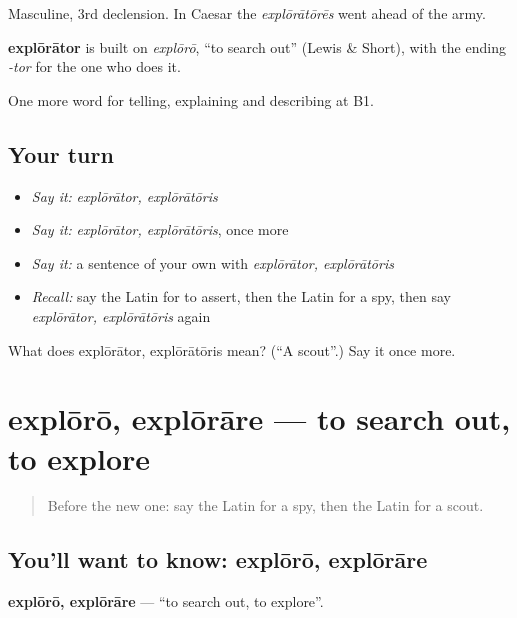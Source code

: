 Masculine, 3rd declension. In Caesar the \emph{explōrātōrēs} went ahead of the army.

\begin{cousinweb}
\textbf{explōrātor} is built on \emph{explōrō}, \textquotedblleft{}to search out\textquotedblright{} (Lewis \& Short), with the ending \emph{-tor} for the one who does it.
\end{cousinweb}

\begin{grammarlens}[title={What you've built}]
One more word for telling, explaining and describing at B1.
\end{grammarlens}

\subsection*{Your turn}
\begin{itemize}
\raggedright
  \item \emph{Say it:} \emph{explōrātor, explōrātōris}
  \item \emph{Say it:} \emph{explōrātor, explōrātōris}, once more
  \item \emph{Say it:} a sentence of your own with \emph{explōrātor, explōrātōris}
  \item \emph{Recall:} say the Latin for to assert, then the Latin for a spy, then say \emph{explōrātor, explōrātōris} again
\end{itemize}

\begin{tcolorbox}[breakable,colback=teal!4,colframe=teal!35!black,title={Before you move on}]
What does explōrātor, explōrātōris mean? (\textquotedblleft{}A scout\textquotedblright{}.) Say it once more.
\end{tcolorbox}
\section[explōrō, explōrāre]{explōrō, explōrāre — to search out, to explore}

\label{lesson:LA-C302-exploro}



\begin{quote}
Before the new one: say the Latin for a spy, then the Latin for a scout.
\end{quote}

\subsection*{You'll want to know: explōrō, explōrāre}
\textbf{explōrō, explōrāre} — \textquotedblleft{}to search out, to explore\textquotedblright{}.

